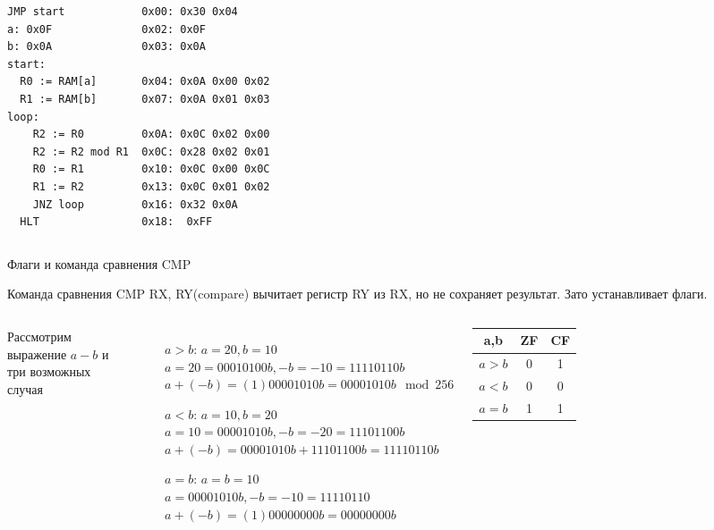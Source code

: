 \documentclass{beamer}
\begin{document}
\begin{frame}[fragile]
\begin{columns}
            \begin{verbatim}
JMP start            0x00: 0x30 0x04
a: 0x0F              0x02: 0x0F
b: 0x0A              0x03: 0x0A
start:
  R0 := RAM[a]       0x04: 0x0A 0x00 0x02
  R1 := RAM[b]       0x07: 0x0A 0x01 0x03
loop:
    R2 := R0         0x0A: 0x0C 0x02 0x00
    R2 := R2 mod R1  0x0C: 0x28 0x02 0x01
    R0 := R1         0x10: 0x0C 0x00 0x0C
    R1 := R2         0x13: 0x0C 0x01 0x02
    JNZ loop         0x16: 0x32 0x0A
  HLT                0x18:  0xFF
            \end{verbatim}
        \end{columns}
\end{frame}
    \begin{frame}{Флаги и команда сравнения CMP}

    Команда сравнения CMP RX, RY(compare) вычитает регистр RY из RX, но не сохраняет результат. Зато устанавливает флаги.


    \begin{columns}
        Рассмотрим выражение $a - b$ и три возможных случая
        \begin{itemize}\small
            \item[$a > b$:] $a = 20, b = 10$ \\
            $a = 20 = 00010100b, -b = -10 = 11110110b$ \\
            $a + (-b) = (1)00001010b = 00001010b \mod 256$
            \item[$a < b$:] $a = 10, b = 20$ \\
            $a = 10 = 00001010b, -b = -20 = 11101100b$ \\
            $a + (-b) = 00001010b + 11101100b = 11110110b$
            \item[$a = b$:] $a = b = 10$ \\
            $a = 00001010b , -b = -10 = 11110110$ \\
            $a + (-b) = (1)00000000b = 00000000b$
        \end{itemize}
            \begin{tabular}{|c|c|c|}
                \hline a,b & ZF & CF  \\
                \hline $a > b$ & 0 & 1 \\
                \hline $a < b$ & 0 & 0 \\
                \hline $a = b$ & 1 & 1 \\
                \hline
            \end{tabular}
    \end{columns}
    \end{frame}
\end{document}
